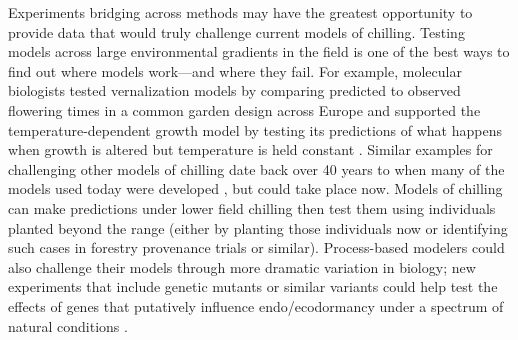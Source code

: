 \documentclass[11pt]{article}
\begin{document}
Experiments bridging across methods may have the greatest opportunity to provide data that would truly challenge current models of chilling. Testing models across large environmental gradients in the field is one of the best ways to find out where models work---and where they fail. For example, molecular biologists tested vernalization models by comparing predicted to observed flowering times in a common garden design across Europe \citep[][]{Wilczek:2009oa} and supported the temperature-dependent growth model by testing its predictions of what happens when growth is altered but temperature is held constant \citep{zhao2020temperature}. Similar examples for challenging other models of chilling date back over 40 years to when many of the models used today were developed \citep{richardson1974,chuine2016,ospreebbms}, but could take place now. Models of chilling can make predictions under lower field chilling then test them using individuals planted beyond the range (either by planting those individuals now or identifying such cases in forestry provenance trials or similar). Process-based modelers could also challenge their models through more dramatic variation in biology; new experiments that include genetic mutants or similar variants \citep[e.g.,][]{azeez2021early,pan2023epigenetic} could help test the effects of genes that putatively influence endo/ecodormancy under a spectrum of natural conditions \citep{Satake2022}. 

\end{document}
